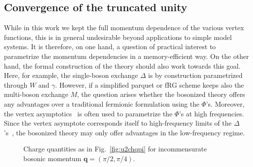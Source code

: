 \documentclass[epj]{svjour}
\newcommand{\qv}{\ensuremath{\mathbf{q}}}
\begin{document}
\subsection{Convergence of the truncated unity}
While in this work we kept the full momentum dependence of the various vertex functions,
this is in general undesirable beyond applications to simple model systems.
It is therefore, on one hand, a question of practical interest to parametrize the momentum dependencies
in a memory-efficient way. On the other hand, the formal construction of the theory should also work towards this goal. Here, for example, the single-boson exchange $\Delta$
is by construction parametrized through $W$ and $\gamma$.
However, if a simplified parquet or fRG scheme keeps also the multi-boson exchange $M$,
the question arises whether the bosonized theory offers any advantages over a
traditional fermionic formulation using the $\Phi$'s.
Moreover, the vertex asymptotics~\cite{Wentzell20} is often used to parametrize the $\Phi$'s at high frequencies.
Since the vertex asymptote corresponds itself to high-frequency limits of the $\Delta$'s~\cite{Krien19-2,Harkov21},
the bosonized theory may only offer advantages in the low-frequency regime.

\begin{figure}
  \begin{center}
\end{center}
    \caption{\label{fig:u2qpi2pi4} Charge quantities as in Fig.~\ref{fig:u2chqpi} for incommensurate
    bosonic momentum $\qv=(\pi/2,\pi/4)$.}
\end{figure}
\end{document}
